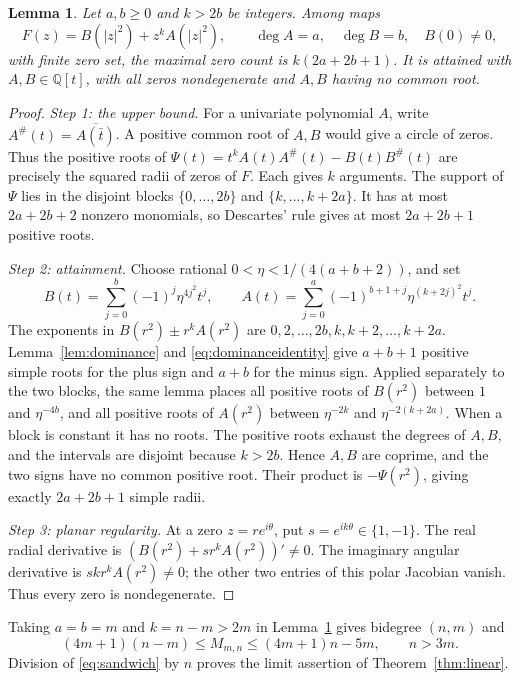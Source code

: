 \documentclass[a4paper]{amsart}
\newtheorem{lem}[thm]{Lemma}
\theoremstyle{remark}
\newcommand{\Q}{\mathbb Q}
\begin{document}
\begin{lem}\label{lem:radial}
Let \(a,b\ge0\) and \(k>2b\) be integers.
Among maps
\[
 F(z)=B(|z|^2)+z^kA(|z|^2),\qquad
 \deg A=a,\quad\deg B=b,\quad B(0)\ne0,
\]
with finite zero set, the maximal zero count is
\(k(2a+2b+1)\).
It is attained with \(A,B\in\Q[t]\), with all zeros
nondegenerate and \(A,B\) having no common root.
\end{lem}

\begin{proof}
\emph{Step 1: the upper bound.}
For a univariate polynomial \(A\), write
\(A^\#(t)=\overline{A(\bar t)}\).
A positive common root of \(A,B\) would give a circle of
zeros. Thus the positive roots of
\(\Psi(t)=t^kA(t)A^\#(t)-B(t)B^\#(t)\)
are precisely the squared radii of zeros of \(F\).
Each gives \(k\) arguments.
The support of \(\Psi\) lies in the disjoint blocks
\(\{0,\ldots,2b\}\) and \(\{k,\ldots,k+2a\}\).
It has at most \(2a+2b+2\) nonzero monomials, so
Descartes' rule gives at most \(2a+2b+1\) positive roots.

\emph{Step 2: attainment.}
Choose rational \(0<\eta<1/(4(a+b+2))\), and set
\begin{equation}\label{eq:radialcoefficients}
 B(t)=\sum_{j=0}^b(-1)^j\eta^{4j^2}t^j,\qquad
 A(t)=\sum_{j=0}^a(-1)^{b+1+j}\eta^{(k+2j)^2}t^j.
\end{equation}
The exponents in \(B(r^2)\pm r^kA(r^2)\) are
\(0,2,\ldots,2b,k,k+2,\ldots,k+2a\).
Lemma~\ref{lem:dominance} and
\eqref{eq:dominanceidentity} give \(a+b+1\)
positive simple roots for the plus sign and \(a+b\)
for the minus sign.
Applied separately to the two blocks, the same lemma
places all positive roots of \(B(r^2)\) between
\(1\) and \(\eta^{-4b}\), and all positive roots of
\(A(r^2)\) between \(\eta^{-2k}\) and
\(\eta^{-2(k+2a)}\).
When a block is constant it has no roots.
The positive roots exhaust the degrees of \(A,B\),
and the intervals are disjoint because \(k>2b\).
Hence \(A,B\) are coprime, and the two signs have
no common positive root.
Their product is \(-\Psi(r^2)\), giving exactly
\(2a+2b+1\) simple radii.

\emph{Step 3: planar regularity.}
At a zero \(z=re^{i\theta}\), put
\(s=e^{ik\theta}\in\{1,-1\}\).
The real radial derivative is
\((B(r^2)+sr^kA(r^2))'\ne0\).
The imaginary angular derivative is
\(sk r^kA(r^2)\ne0\); the other two entries of
this polar Jacobian vanish. Thus every zero is
nondegenerate.
\end{proof}

Taking \(a=b=m\) and \(k=n-m>2m\) in
Lemma~\ref{lem:radial} gives bidegree \((n,m)\) and
\begin{equation}\label{eq:sandwich}
 (4m+1)(n-m)\le M_{m,n}\le(4m+1)n-5m,
 \qquad n>3m.
\end{equation}
Division of \eqref{eq:sandwich} by \(n\) proves the limit
assertion of Theorem~\ref{thm:linear}.
\end{document}
